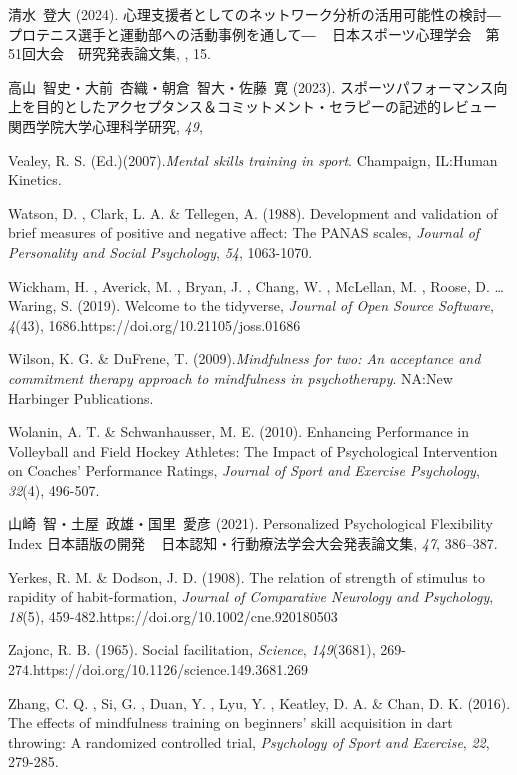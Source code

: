 \documentclass[12pt,a4paper,xelatex,ja=standard]{bxjsarticle}
\begin{document}
清水~登大 (2024).
心理支援者としてのネットワーク分析の活用可能性の検討―プロテニス選手と運動部への活動事例を通して―
~ 日本スポーツ心理学会　第51回大会　研究発表論文集, , 15.

高山~智史・大前~杏織・朝倉~智大・佐藤~寛 (2023).
スポーツパフォーマンス向上を目的としたアクセプタンス＆コミットメント・セラピーの記述的レビュー
~ 関西学院大学心理科学研究, \emph{49},

Vealey, R. S. (Ed.)(2007).\emph{Mental skills training in sport}.
Champaign, IL:Human Kinetics.

Watson, D. , Clark, L. A. \& Tellegen, A. (1988). Development and
validation of brief measures of positive and negative affect: The PANAS
scales, \emph{Journal of Personality and Social Psychology}, \emph{54},
1063-1070.

Wickham, H. , Averick, M. , Bryan, J. , Chang, W. , McLellan, M. ,
Roose, D. \ldots Waring, S. (2019). Welcome to the tidyverse,
\emph{Journal of Open Source Software}, \emph{4}(43),
1686.https://doi.org/10.21105/joss.01686

Wilson, K. G. \& DuFrene, T.
(2009).\emph{Mindfulness for two: An acceptance and commitment therapy approach to mindfulness in psychotherapy}.
NA:New Harbinger Publications.

Wolanin, A. T. \& Schwanhausser, M. E. (2010). Enhancing Performance in
Volleyball and Field Hockey Athletes: The Impact of Psychological
Intervention on Coaches' Performance Ratings,
\emph{Journal of Sport and Exercise Psychology}, \emph{32}(4), 496-507.

山崎~智・土屋~政雄・国里~愛彦 (2021). Personalized Psychological
Flexibility Index 日本語版の開発 ~ 日本認知・行動療法学会大会発表論文集,
\emph{47}, 386--387.

Yerkes, R. M. \& Dodson, J. D. (1908). The relation of strength of
stimulus to rapidity of habit-formation,
\emph{Journal of Comparative Neurology and Psychology}, \emph{18}(5),
459-482.https://doi.org/10.1002/cne.920180503

Zajonc, R. B. (1965). Social facilitation, \emph{Science},
\emph{149}(3681), 269-274.https://doi.org/10.1126/science.149.3681.269

Zhang, C. Q. , Si, G. , Duan, Y. , Lyu, Y. , Keatley, D. A. \& Chan, D.
K. (2016). The effects of mindfulness training on beginners' skill
acquisition in dart throwing: A randomized controlled trial,
\emph{Psychology of Sport and Exercise}, \emph{22}, 279-285.

\endgroup
\end{document}
